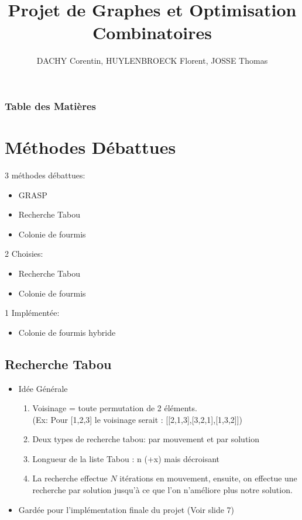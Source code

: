 \documentclass[b]{beamer}
\title[Projet de Graphes et Optimisation Combinatoire]{Projet de Graphes et Optimisation Combinatoires}
\author{DACHY Corentin, HUYLENBROECK Florent, JOSSE Thomas}
\begin{document}
\begin{frame}
	\titlepage
\end{frame}

\begin{frame}
	\frametitle{Table des Matières}
	\tableofcontents
\end{frame}

\section{Méthodes Débattues}

\begin{frame}
	
	3 méthodes débattues:
	\begin{itemize}
		\item GRASP
		\item Recherche Tabou
		\item Colonie de fourmis
	\end{itemize}
	2 Choisies:
		\begin{itemize}
			\item Recherche Tabou
			\item Colonie de fourmis
		\end{itemize}
	1 Implémentée:
		\begin{itemize}
			\item Colonie de fourmis hybride
		\end{itemize}
\end{frame}

\subsection{Recherche Tabou}
\begin{frame}
	\begin{itemize}
		\item Idée Générale\\
		\begin{enumerate}
			\item Voisinage = toute permutation de 2 éléments.\\
			(Ex: Pour [1,2,3] le voisinage serait : [[2,1,3],[3,2,1],[1,3,2]])
			\item Deux types de recherche tabou: par mouvement et par solution
			\item Longueur de la liste Tabou : n (+x) mais décroisant
			\item La recherche effectue $N$ itérations en mouvement, ensuite, on effectue une recherche par solution jusqu'à ce que l'on n'améliore plus notre solution.
		\end{enumerate}
		\item Gardée pour l'implémentation finale du projet (Voir slide 7)
	\end{itemize}
\end{frame}
\end{document}
